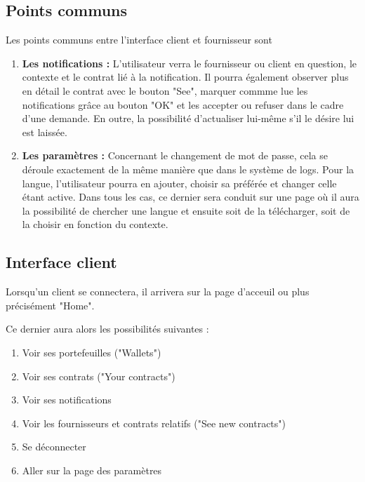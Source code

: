 \subsection{Points communs}
Les points communs entre l'interface client et fournisseur sont
\begin{enumerate}
\item \textbf{Les notifications :}\newline
L'utilisateur verra le fournisseur ou client en question, le contexte et le contrat lié à la notification.\newline
Il pourra également observer plus en détail le contrat avec le bouton "See", marquer commme lue les notifications grâce au bouton "OK" et les accepter ou refuser dans le cadre d'une demande.\newline
En outre, la possibilité d'actualiser lui-même s'il le désire lui est laissée.
\item \textbf{Les paramètres :}\newline
Concernant le changement de mot de passe, cela se déroule exactement de la même manière que dans le système de logs.
Pour la langue, l'utilisateur pourra en ajouter, choisir sa préférée et changer celle étant active.\newline
Dans tous les cas, ce dernier sera conduit sur une page où il aura la possibilité de chercher une langue et ensuite soit de la télécharger, soit de la choisir en fonction du contexte.
\end{enumerate}



\newpage
\subsection{Interface client}

Lorsqu'un client se connectera, il arrivera sur la page d'acceuil ou plus précisément "Home".
\begin{flushleft}
Ce dernier aura alors les possibilités suivantes :
\end{flushleft}
\begin{enumerate}
\item Voir ses portefeuilles ("Wallets")
\item Voir ses contrats ("Your contracts")
\item Voir ses notifications
\item Voir les fournisseurs et contrats relatifs ("See new contracts")
\item Se déconnecter
\item Aller sur la page des paramètres
\end{enumerate}

